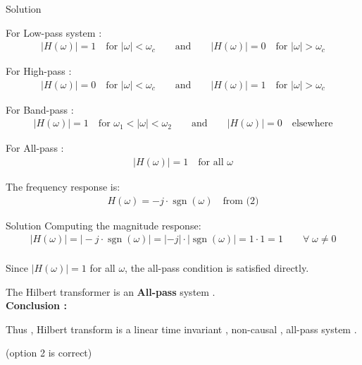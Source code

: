 \documentclass{beamer}
\begin{document}
\begin{frame}{Solution}
    
For Low-pass system :
\begin{align}
|H(\omega)| = 1 \quad \text{for } |\omega| < \omega_c
\qquad \text{and} \qquad
|H(\omega)| = 0 \quad \text{for } |\omega| > \omega_c
\end{align}

For High-pass :
\begin{align}
|H(\omega)| = 0 \quad \text{for } |\omega| < \omega_c
\qquad \text{and} \qquad
|H(\omega)| = 1 \quad \text{for } |\omega| > \omega_c
\end{align}

For Band-pass :
\begin{align}
|H(\omega)| = 1 \quad \text{for } \omega_1 < |\omega| < \omega_2
\qquad \text{and} \qquad
|H(\omega)| = 0 \quad \text{elsewhere}
\end{align}

For All-pass :
\begin{align}
|H(\omega)| = 1 \quad \text{for all } \omega
\end{align}

The frequency response is:
\begin{align}
H(\omega) = -j \cdot \operatorname{sgn}(\omega)   \quad  \text{from (2)}
\end{align}



\end{frame}

\begin{frame}{Solution}
    Computing the magnitude response:
\begin{align}
|H(\omega)|
= \bigl|-j \cdot \operatorname{sgn}(\omega)\bigr|
= |-j| \cdot |\operatorname{sgn}(\omega)|
= 1 \cdot 1
= 1
\qquad \forall\; \omega \neq 0
\end{align}
\\
Since $|H(\omega)| = 1$ for all $\omega$, the all-pass condition is satisfied directly.

\quad

The Hilbert transformer is an \textbf{All-pass} system . \\

 \textbf{Conclusion :}

Thus , Hilbert transform is a linear time invariant , non-causal , all-pass system .

(option 2 is correct)

\end{frame}
\end{document}

